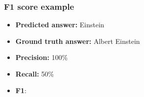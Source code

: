 \documentclass{article}
\begin{document}
\subsubsection{F1 score example}
\begin{itemize}
    \item \textbf{Predicted answer:} Einstein
    \item \textbf{Ground truth answer:} Albert Einstein
    \item \textbf{Precision:} 100\%
    \item \textbf{Recall:} 50\%
    \item \textbf{F1}: 
    
\end{itemize}



\end{document}
